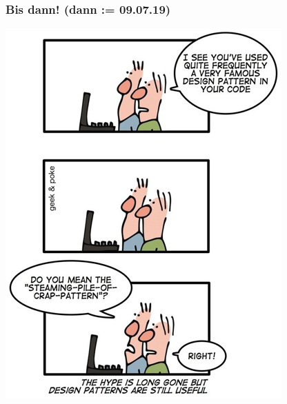 \documentclass[18pt]{beamer}
\begin{document}
	\begin{frame}
		\frametitle{Bis dann! (dann  := 09.07.19)}
		\centering
		\includegraphics[scale=0.4]{./comics/patterns.jpg}
	\end{frame}
\end{document}
